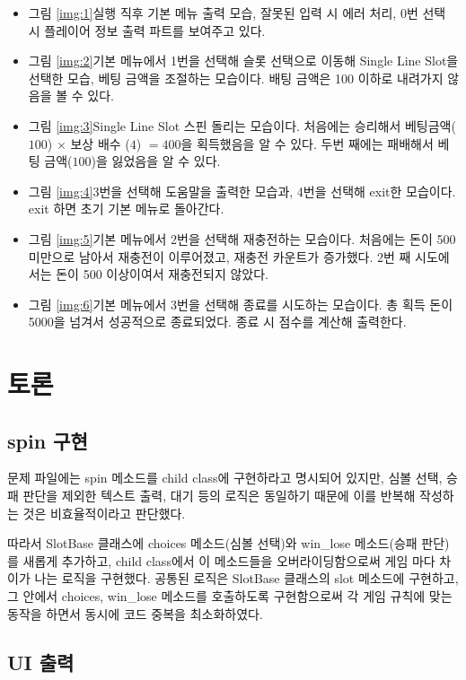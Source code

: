 \documentclass{article}
\begin{document}
\begin{itemize}
  \item 그림 \ref{img:1}\은 실행 직후 기본 메뉴 출력 모습, 잘못된 입력 시 에러 처리, 0번 선택 시 플레이어 정보 출력 파트를 보여주고 있다.
  \item 그림 \ref{img:2}\은 기본 메뉴에서 1번을 선택해 슬롯 선택으로 이동해 Single Line Slot을 선택한 모습, 베팅 금액을 조절하는 모습이다. 배팅 금액은 100 이하로 내려가지 않음을 볼 수 있다.
  \item 그림 \ref{img:3}\은 Single Line Slot 스핀 돌리는 모습이다. 처음에는 승리해서 베팅금액($100$) $\times$ 보상 배수 ($4$) $= 400$을 획득했음을 알 수 있다. 두번 째에는 패배해서 베팅 금액($100$)을 잃었음을 알 수 있다.
  \item 그림 \ref{img:4}\은 3번을 선택해 도움말을 출력한 모습과, 4번을 선택해 exit한 모습이다. exit 하면 초기 기본 메뉴로 돌아간다. 
  \item 그림 \ref{img:5}\은 기본 메뉴에서 2번을 선택해 재충전하는 모습이다. 처음에는 돈이 500 미만으로 남아서 재충전이 이루어졌고, 재충전 카운트가 증가했다. 2번 째 시도에서는 돈이 500 이상이여서 재충전되지 않았다. 
  \item 그림 \ref{img:6}\은 기본 메뉴에서 3번을 선택해 종료를 시도하는 모습이다. 총 획득 돈이 5000을 넘겨서 성공적으로 종료되었다. 종료 시 점수를 계산해 출력한다.
\end{itemize}

\section{토론}

\subsection{spin 구현}

문제 파일에는 spin 메소드를 child class에 구현하라고 명시되어 있지만,
심볼 선택, 승패 판단을 제외한 텍스트 출력, 대기 등의 로직은 동일하기 때문에
이를 반복해 작성하는 것은 비효율적이라고 판단했다.

따라서 SlotBase 클래스에 choices 메소드(심볼 선택)와 win\_lose 메소드(승패 판단)를 새롭게 추가하고, child class에서 이 메소드들을 오버라이딩함으로써 게임 마다 차이가 나는 로직을 구현했다.
공통된 로직은 SlotBase 클래스의 slot 메소드에 구현하고, 그 안에서 choices, win\_lose 메소드를 호출하도록
구현함으로써 각 게임 규칙에 맞는 동작을 하면서 동시에 코드 중복을 최소화하였다.

\subsection{UI 출력}
\end{document}
